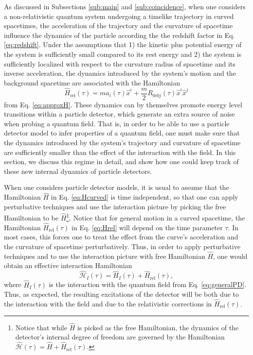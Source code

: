\documentclass[prd,twocolumn,superscriptaddress,floatfix,amsmath,amssymb,amsfonts,longbibliography,nofootinbib]{revtex4-1}
\begin{document}
As discussed in Subsections \ref{sub:main} and \ref{sub:coincidence}, when one considers a non-relativistic quantum system undergoing a timelike trajectory in curved spacetimes, the acceleration of the trajectory and the curvature of spacetime influence the dynamics of the particle according the the redshift factor in Eq. \eqref{eq:redshift}. Under the assumptions that 1) the kinetic plus potential energy of the system is sufficiently small compared to its rest energy and 2) the system is sufficiently localized with respect to the curvature radius of spacetime and its inverse acceleration, the dynamics introduced by the system's motion and the background spacetime are associated with the Hamiltonian 
\begin{equation}\label{eq:Hrel}
    \hat{H}_{\text{rel}}(\tau) = m a_i(\tau) \hat{x}^i + \frac{m}{2}R_{0i0j}(\tau)\hat{x}^i \hat{x}^j
\end{equation}
from Eq. \eqref{eq:approxH}. These dynamics can by themselves promote energy level transitions within a particle detector, which generate an extra source of noise when probing a quantum field. That is, in order to be able to use a particle detector model to infer properties of a quantum field, one must make sure that the dynamics introduced by the system's trajectory and curvature of spacetime are sufficiently smaller than the effect of the interaction with the field. In this section, we discuss this regime in detail, and show how one could keep track of these new internal dynamics of particle detectors.

When one considers particle detector models, it is usual to assume that the Hamiltonian $\hat{H}$ in Eq. \eqref{eq:Hcurved} is time independent, so that one can apply perturbative techniques and use the interaction picture by picking the free Hamiltonian to be $\hat{H}$\footnote{Notice that while $\hat{H}$ is picked as the free Hamiltonian, the dynamics of the detector's internal degree of freedom are governed by the Hamiltonian $\hat{\mathcal{H}}(\tau) = \hat{H} + \hat{H}_{\text{rel}}(\tau)$.}. Notice that for general motion in a curved spacetime, the Hamiltonian $\hat{H}_\text{rel}(\tau)$ in Eq. \eqref{eq:Hrel} will depend on the time parameter $\tau$. In most cases, this forces one to treat the effect from the curve's acceleration and the curvature of spacetime perturbatively. Thus, in order to apply perturbative techniques and to use the interaction picture with free Hamiltonian $\hat{H}$, one would obtain an effective interaction Hamiltonian
\begin{equation}
    \hat{\mathcal{H}}_I(\tau) = \hat{H}_I(\tau) + \hat{H}_{\text{rel}}(\tau),
\end{equation}
where $\hat{H}_I(\tau)$ is the interaction with the quantum field from Eq. \eqref{eq:generalPD}. Thus, as expected, the resulting excitations of the detector will be both due to the interaction with the field and due to the relativistic corrections in $\hat{H}_\text{rel}(\tau)$.
\end{document}
